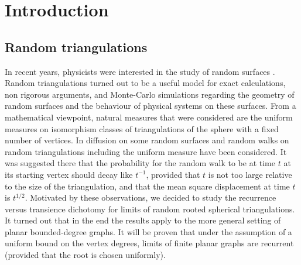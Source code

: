 \documentclass[12pt,naturalnames]{article}
\numberwithin{equation}{section}
\numberwithin{figure}{section}
\numberwithin{theorem}{section}
\def\ADJBooK{MR98i:82001}
\def\AAIJW{MR99m:83059}
\def\ABNRW{MR99c:83026}
\begin{document}
\maketitle

\begin {abstract}
Suppose that $G_j$ is a sequence of finite connected planar graphs,
and in each $G_j$ a special vertex, called the root, is chosen
randomly-uniformly.
We introduce the notion of a distributional limit $G$ of such graphs.
Assume that the vertex degrees of the vertices in $G_j$ are bounded, and
the bound does not depend on $j$.  Then after passing to a subsequence,
the limit exists, and is a random rooted graph $G$.
We prove that with probability one $G$ is recurrent.
The proof involves the Circle Packing Theorem.
The motivation for this work comes from the theory of random spherical
triangulations.
\end {abstract}

\section{Introduction}

\subsection{Random triangulations}

In recent years, physicists were interested in the study of random
surfaces \cite{\ADJBooK}. Random triangulations turned out to be a useful model
for exact calculations, non rigorous arguments, and Monte-Carlo simulations
regarding the geometry of random surfaces and the behaviour of physical systems
on these surfaces. From a mathematical viewpoint, natural measures that were
considered are the uniform measures on  isomorphism classes of
triangulations of the sphere with a fixed number of vertices. In \cite{\AAIJW,\ABNRW}
diffusion on some random surfaces and random walks on random triangulations including
the uniform measure have been
considered. It was suggested there that the probability
for the random walk to be at time $t$ at its starting vertex should
decay like $t^{-1}$, provided that
$t$ is not too large relative to the size of the triangulation, and that
the mean square displacement at time $t$ is $t^{1/2}$.
Motivated by these observations, we decided to study the recurrence
versus transience dichotomy for
limits of random rooted spherical triangulations.  It turned out
that in the end the results apply to the more general setting of
planar bounded-degree graphs.
It will be proven that under the assumption of a
uniform bound on the vertex degrees, limits of finite
planar graphs are recurrent (provided that the root is chosen uniformly).
\end{document}
